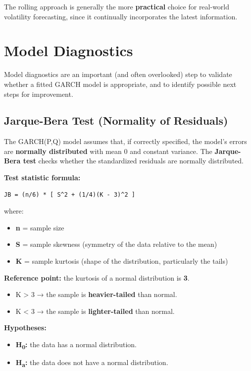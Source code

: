 \documentclass[12pt,openany]{book}
\theoremstyle{definition}
\theoremstyle{remark}
\begin{document}
The rolling approach is generally the more \textbf{practical} choice for real-world volatility forecasting, since it continually incorporates the latest information.


\section{Model Diagnostics}

Model diagnostics are an important (and often overlooked) step to validate whether a fitted GARCH model is appropriate, and to identify possible next steps for improvement.

\subsection{Jarque-Bera Test (Normality of Residuals)}

The GARCH(P,Q) model assumes that, if correctly specified, the model's errors are \textbf{normally distributed} with mean 0 and constant variance. The \textbf{Jarque-Bera test} checks whether the standardized residuals are normally distributed.

\textbf{Test statistic formula:}

\begin{lstlisting}[style=notesCode]
JB = (n/6) * [ S^2 + (1/4)(K - 3)^2 ]
\end{lstlisting}

where:
\begin{itemize}
\item \textbf{n} = sample size
\item \textbf{S} = sample skewness (symmetry of the data relative to the mean)
\item \textbf{K} = sample kurtosis (shape of the distribution, particularly the tails)
\end{itemize}

\textbf{Reference point:} the kurtosis of a normal distribution is \textbf{3}.
\begin{itemize}
\item K > 3 → the sample is \textbf{heavier-tailed} than normal.
\item K < 3 → the sample is \textbf{lighter-tailed} than normal.
\end{itemize}

\textbf{Hypotheses:}
\begin{itemize}
\item \textbf{H\textsubscript{0}:} the data has a normal distribution.
\item \textbf{H\textsubscript{a}:} the data does not have a normal distribution.
\end{itemize}
\end{document}
